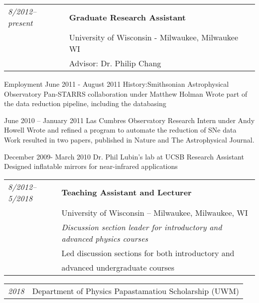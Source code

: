\documentclass[12pt,notitlepage]{report}
\begin{document}
\bigskip
{}
\medskip

\begin{tabular}{ll}
{\it 8/2012--present} & {\bf Graduate Research Assistant} \\
				& University of Wisconsin - Milwaukee, Milwaukee WI \\
				& Advisor: Dr. Philip Chang \\
\end{tabular}	        


Employment  June 2011 - August 2011 
History:Smithsonian Astrophysical Observatory  
 Pan-STARRS collaboration under Matthew Holman
Wrote part of the data reduction pipeline, including the databasing

June 2010 – January 2011
 Las Cumbres Observatory
Research Intern under Andy Howell
Wrote and refined a program to automate the reduction of SNe data
Work resulted in two papers, published in Nature and The Astrophysical Journal.

December 2009- March 2010 
 Dr. Phil Lubin’s lab at UCSB
Research Assistant
Designed inflatable mirrors for near-infrared applications

\newpage
			        				
\bigskip
{}
\medskip

\begin{tabular}{ll}
{\it 8/2012--5/2018} & {\bf Teaching Assistant and Lecturer}\\		
				& University of Wisconsin -- Milwaukee, Milwaukee, WI \\
				& {\it Discussion section leader for introductory and advanced physics courses} \\
				& Led discussion sections for both introductory and \\
                                & advanced undergraduate courses \\
			        				
\end{tabular}

%
\bigskip
{}
\medskip

%
\begin{tabular}{ll}
{\it 2018} & Department of Physics Papastamatiou Scholarship (UWM)\\
%
\end{tabular}
\end{document}
